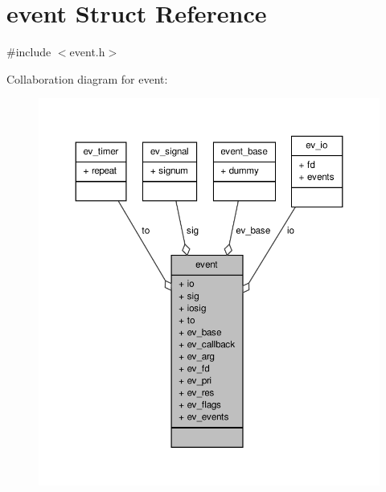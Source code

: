 \hypertarget{structevent}{\section{event \-Struct \-Reference}
\label{structevent}
}


{\ttfamily \#include $<$event.\-h$>$}



\-Collaboration diagram for event\-:
\nopagebreak
\begin{figure}[H]
\begin{center}
\leavevmode
\includegraphics[width=350pt]{structevent__coll__graph}
\end{center}
\end{figure}
